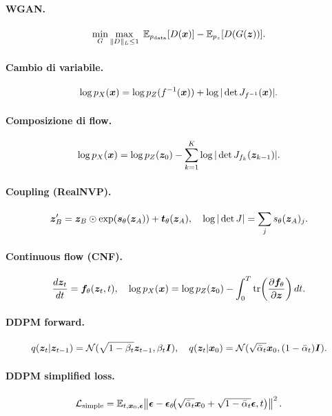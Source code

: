 \paragraph{WGAN.}
\[
\min_G \max_{\|D\|_L \leq 1}\; \mathbb{E}_{p_{\text{data}}}[D(\bm{x})] - \mathbb{E}_{p_z}[D(G(\bm{z}))].
\]

\paragraph{Cambio di variabile.}
\[
\log p_X(\bm{x}) = \log p_Z(f^{-1}(\bm{x})) + \log|\det J_{f^{-1}}(\bm{x})|.
\]

\paragraph{Composizione di flow.}
\[
\log p_X(\bm{x}) = \log p_Z(\bm{z}_0) - \sum_{k=1}^K \log|\det J_{f_k}(\bm{z}_{k-1})|.
\]

\paragraph{Coupling (RealNVP).}
\[
\bm{z}'_B = \bm{z}_B \odot \exp(\bm{s}_\theta(\bm{z}_A)) + \bm{t}_\theta(\bm{z}_A),\quad \log|\det J| = \sum_j s_\theta(\bm{z}_A)_j.
\]

\paragraph{Continuous flow (CNF).}
\[
\frac{d\bm{z}_t}{dt} = \bm{f}_\theta(\bm{z}_t, t), \quad \log p_X(\bm{x}) = \log p_Z(\bm{z}_0) - \int_0^T \mathrm{tr}\!\left(\frac{\partial \bm{f}_\theta}{\partial \bm{z}}\right) dt.
\]

\paragraph{DDPM forward.}
\[
q(\bm{z}_t|\bm{z}_{t-1}) = \mathcal{N}(\sqrt{1-\beta_t}\bm{z}_{t-1}, \beta_t \bm{I}), \quad q(\bm{z}_t|\bm{x}_0) = \mathcal{N}(\sqrt{\bar\alpha_t}\bm{x}_0, (1-\bar\alpha_t)\bm{I}).
\]

\paragraph{DDPM simplified loss.}
\[
\mathcal{L}_{\text{simple}} = \mathbb{E}_{t,\bm{x}_0,\boldsymbol{\epsilon}}\!\left\| \boldsymbol{\epsilon} - \boldsymbol{\epsilon}_\theta\!\big(\sqrt{\bar\alpha_t}\bm{x}_0 + \sqrt{1-\bar\alpha_t}\boldsymbol{\epsilon}, t\big)\right\|^2.
\]

